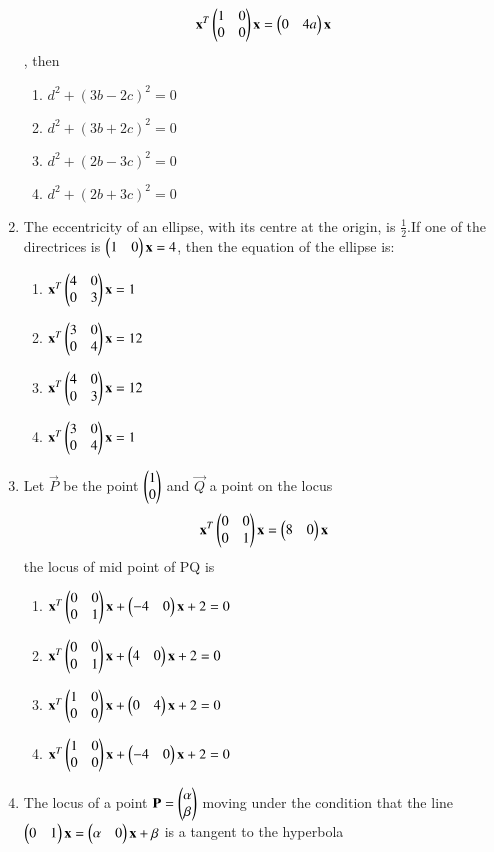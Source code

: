 \begin{enumerate}[label=\arabic*.,ref=\thesubsection.\theenumi]
    \begin{align}
    \mathbf{x}^T\begin{pmatrix}1&0\\0&0\end{pmatrix}\mathbf{x}=\begin{pmatrix}0&4a\end{pmatrix}\mathbf{x}
    \end{align}, then 
    \begin{enumerate}
    \item $d^2+(3b-2c)^2=0$
    \item $d^2+(3b+2c)^2=0$
    \item $d^2+(2b-3c)^2=0$
    \item $d^2+(2b+3c)^2=0$
    \end{enumerate}
    \item The eccentricity of an ellipse, with its centre at the origin, is $\frac{1}{2}$.If one of the directrices is $\begin{pmatrix}1&0\end{pmatrix}\mathbf{x}=4$, then the equation of the ellipse is:
    \begin{enumerate}
    \item $\mathbf{x}^T\begin{pmatrix}4&0\\0&3\end{pmatrix}\mathbf{x}=1$
    \item $\mathbf{x}^T\begin{pmatrix}3&0\\0&4\end{pmatrix}\mathbf{x}=12$
    \item $\mathbf{x}^T\begin{pmatrix}4&0\\0&3\end{pmatrix}\mathbf{x}=12$ 
    \item $\mathbf{x}^T\begin{pmatrix}3&0\\0&4\end{pmatrix}\mathbf{x}=1$
    \end{enumerate}
    \item Let $\vec{P}$ be the point $\begin{pmatrix}1\\0\end{pmatrix}$ and $\vec{Q}$ a point on the locus 
    \begin{align}
    \mathbf{x}^T\begin{pmatrix}0&0\\0&1\end{pmatrix}\mathbf{x}=\begin{pmatrix}8&0\end{pmatrix}\mathbf{x}
    \end{align}
    the locus of mid point of PQ is 
    \begin{enumerate}
    \item $\mathbf{x}^T\begin{pmatrix}0&0\\0&1\end{pmatrix}\mathbf{x}+\begin{pmatrix}-4&0\end{pmatrix}\mathbf{x}+2=0$
    \item $\mathbf{x}^T\begin{pmatrix}0&0\\0&1\end{pmatrix}\mathbf{x}+\begin{pmatrix}4&0\end{pmatrix}\mathbf{x}+2=0$
    \item $\mathbf{x}^T\begin{pmatrix}1&0\\0&0\end{pmatrix}\mathbf{x}+\begin{pmatrix}0&4\end{pmatrix}\mathbf{x}+2=0$
    \item $\mathbf{x}^T\begin{pmatrix}1&0\\0&0\end{pmatrix}\mathbf{x}+\begin{pmatrix}-4&0\end{pmatrix}\mathbf{x}+2=0$
    \end{enumerate}
    \item The locus of a point $\mathbf{P} = \begin{pmatrix}\alpha\\\beta\end{pmatrix}$ moving under the condition that the line $\begin{pmatrix}0&1\end{pmatrix}\mathbf{x}=\begin{pmatrix}\alpha&0\end{pmatrix}\mathbf{x}+\beta$ is a tangent to the hyperbola

\end{enumerate}
